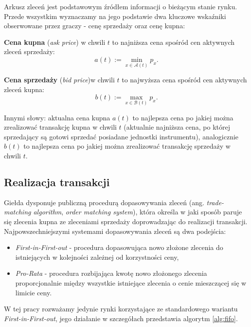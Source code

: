 Arkusz zleceń jest podstawowym źródłem informacji o bieżącym stanie rynku. Przede wszystkim wyznaczamy na jego podstawie dwa kluczowe wskaźniki obserwowane przez graczy - cenę sprzedaży oraz cenę kupna:
\begin{definition}\label{def:askprice}
\textbf{Cena kupna} (\textit{ask price}) w chwili $t$ to najniższa cena spośród cen aktywnych zleceń sprzedaży: 
$$a(t) :=\min_{x\in\mathcal{A}(t)}p_x.$$
\end{definition}
\begin{definition}\label{def:bidprice}
\textbf{Cena sprzedaży} (\textit{bid price})w chwili $t$ to najwyższa cena spośród cen aktywnych zleceń kupna: 
$$b(t) := \max_{x\in \mathcal{B}(t)} p_x.$$
\end{definition}

Innymi słowy: aktualna cena kupna $a(t)$ to najlepsza cena po jakiej można zrealizować transakcję kupna w chwili $t$ (aktualnie najniższa cena, po której sprzedający są gotowi sprzedać posiadane jednostki instrumentu), analogicznie $b(t)$ to najlepsza cena po jakiej można zrealizować transakcję sprzedaży w chwili $t$. 
\subsection{Realizacja transakcji}\label{sec:transactions}
Giełda dysponuje publiczną procedurą dopasowywania zleceń (ang. \textit{trade-matching algorithm}, \textit{order matching system}), która określa w jaki sposób paruje się zlecenia kupna ze zleceniami sprzedaży doprowadzając do realizacji transakcji. Najpowszechniejszymi systemami dopasowywania zleceń są dwa podejścia:
\begin{itemize}
\item \textit{First-in-First-out} - procedura dopasowująca nowo złożone zlecenia do istniejących w kolejności zależnej od korzystności ceny,
\item \textit{Pro-Rata} - procedura rozbijająca kwotę nowo złożonego zlecenia proporcjonalnie między wszystkie istniejące zlecenia o cenie mieszczącej się w limicie ceny.  
\end{itemize}
W tej pracy rozważamy jedynie rynki korzystające ze standardowego wariantu \textit{First-in-First-out}, jego działanie w szczegółach przedstawia algorytm \ref{alg:fifo}.

